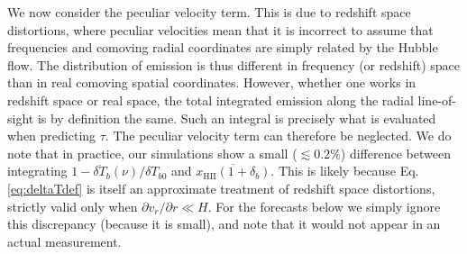 \documentclass[twocolumn,aps,prd,nofootinbib,showpacs,superscriptaddress]{revtex4-1}
\begin{document}
We now consider the peculiar velocity term. This is due to redshift space distortions, where peculiar velocities mean that it is incorrect to assume that frequencies and comoving radial coordinates are simply related by the Hubble flow. The distribution of emission is thus different in frequency (or redshift) space than in real comoving spatial coordinates. However, whether one works in redshift space or real space, the total integrated emission along the radial line-of-sight is by definition the same. Such an integral is precisely what is evaluated when predicting $\tau$. The peculiar velocity term can therefore be neglected. We do note that in practice, our simulations show a small ($\lesssim 0.2\%$) difference between integrating $1- \overline{\delta T}_b (\nu) / \delta T_{b0}$ and $\overline{x_\textrm{HII} (1+\delta_b)}$. This is likely because Eq. \eqref{eq:deltaTdef} is itself an approximate treatment of redshift space distortions, strictly valid only when $\partial v_r / \partial r \ll H$. For the forecasts below we simply ignore this discrepancy (because it is small), and note that it would not appear in an actual measurement.
%
\end{document}
